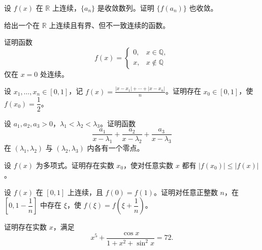 \newpage
\noindent\begin{minipage}{\textwidth}
设 $f(x)$ 在 $\mathbb R$ 上连续，$\{a_n\}$ 是收敛数列。证明 $\{f(a_n)\}$ 也收敛。
\end{minipage}\par\vfill
\noindent\begin{minipage}{\textwidth}
给出一个在 $\mathbb R$ 上连续且有界、但不一致连续的函数。
\end{minipage}\par\vfill
\noindent\begin{minipage}{\textwidth}
证明函数\[f(x)=\begin{cases}0,&x\in\mathbb Q,\\x,&x\notin\mathbb Q\end{cases}\]仅在 $x=0$ 处连续。
\end{minipage}\par\vfill
\noindent\begin{minipage}{\textwidth}
设 $x_1,\ldots,x_n\in[0,1]$，记 $\displaystyle f(x)=\frac{|x-x_1|+\cdots+|x-x_n|}{n}$。证明存在 $x_0\in[0,1]$，使 $f(x_0)=\dfrac12$。
\end{minipage}\par\vfill
\newpage
\noindent\begin{minipage}{\textwidth}
设 $a_1,a_2,a_3>0$，$\lambda_1<\lambda_2<\lambda_3$。证明函数\[\frac{a_1}{x-\lambda_1}+\frac{a_2}{x-\lambda_2}+\frac{a_3}{x-\lambda_3}\]在 $(\lambda_1,\lambda_2)$ 与 $(\lambda_2,\lambda_3)$ 内各有一个零点。
\end{minipage}\par\vfill
\noindent\begin{minipage}{\textwidth}
设 $f(x)$ 为多项式。证明存在实数 $x_0$，使对任意实数 $x$ 都有 $|f(x_0)|\le|f(x)|$。
\end{minipage}\par\vfill
\noindent\begin{minipage}{\textwidth}
设 $f(x)$ 在 $[0,1]$ 上连续，且 $f(0)=f(1)$。证明对任意正整数 $n$，在 $\left[0,1-\dfrac1n\right]$ 中存在 $\xi$，使 $f(\xi)=f\!\left(\xi+\dfrac1n\right)$。
\end{minipage}\par\vfill
\noindent\begin{minipage}{\textwidth}
证明存在实数 $x$，满足\[x^5+\frac{\cos x}{1+x^2+\sin^2x}=72.\]
\end{minipage}\par\vfill
